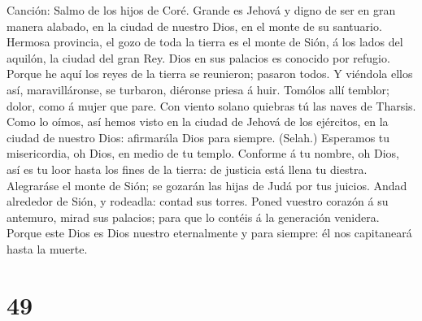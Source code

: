  Canción: Salmo de los hijos de Coré. Grande es Jehová y
digno de ser en gran manera alabado, en la ciudad de nuestro Dios, en el
monte de su santuario.  Hermosa provincia, el gozo de toda
la tierra es el monte de Sión, á los lados del aquilón, la ciudad del
gran Rey.  Dios en sus palacios es conocido por refugio.
 Porque he aquí los reyes de la tierra se reunieron;
pasaron todos.  Y viéndola ellos así, maravilláronse, se
turbaron, diéronse priesa á huir.  Tomólos allí temblor;
dolor, como á mujer que pare.  Con viento solano quiebras
tú las naves de Tharsis.  Como lo oímos, así hemos visto
en la ciudad de Jehová de los ejércitos, en la ciudad de nuestro Dios:
afirmarála Dios para siempre. (Selah.)  Esperamos tu
misericordia, oh Dios, en medio de tu templo.  Conforme á
tu nombre, oh Dios, así es tu loor hasta los fines de la tierra: de
justicia está llena tu diestra.  Alegraráse el monte de
Sión; se gozarán las hijas de Judá por tus juicios. 
Andad alrededor de Sión, y rodeadla: contad sus torres. 
Poned vuestro corazón á su antemuro, mirad sus palacios; para que lo
contéis á la generación venidera.  Porque este Dios es
Dios nuestro eternalmente y para siempre: él nos capitaneará hasta la
muerte.

\hypertarget{section-48}{%
\section{49}\label{section-48}}

